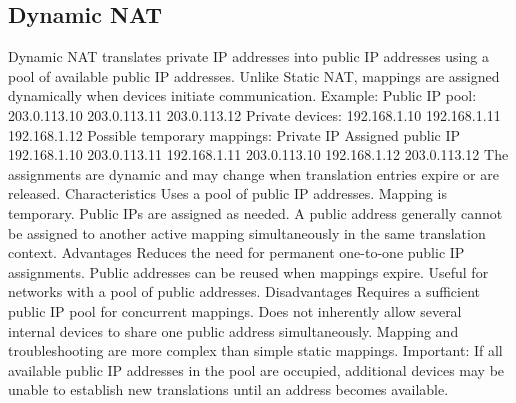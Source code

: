\subsection{Dynamic NAT}
Dynamic NAT translates private IP addresses into public IP addresses using a pool of available public IP addresses.
Unlike Static NAT, mappings are assigned dynamically when devices initiate communication.
Example:
Public IP pool:
203.0.113.10
203.0.113.11
203.0.113.12
Private devices:
192.168.1.10
192.168.1.11
192.168.1.12
Possible temporary mappings:
Private IP
Assigned public IP
192.168.1.10
203.0.113.11
192.168.1.11
203.0.113.10
192.168.1.12
203.0.113.12
The assignments are dynamic and may change when translation entries expire or are released.
Characteristics
Uses a pool of public IP addresses.
Mapping is temporary.
Public IPs are assigned as needed.
A public address generally cannot be assigned to another active mapping simultaneously in the same translation context.
Advantages
Reduces the need for permanent one-to-one public IP assignments.
Public addresses can be reused when mappings expire.
Useful for networks with a pool of public addresses.
Disadvantages
Requires a sufficient public IP pool for concurrent mappings.
Does not inherently allow several internal devices to share one public address simultaneously.
Mapping and troubleshooting are more complex than simple static mappings.
Important: If all available public IP addresses in the pool are occupied, additional devices may be unable to establish new translations until an address becomes available.
